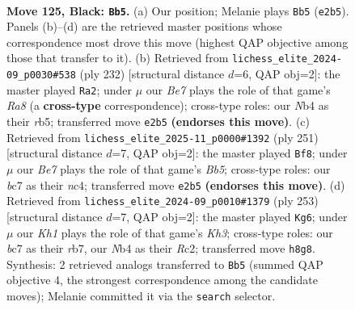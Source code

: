 \documentclass[11pt]{article}
\begin{document}
\clearpage

\begin{figure}[p]\centering
\begin{subfigure}{0.46\textwidth}\centering
\resizebox{\linewidth}{!}{%
\newchessgame
\chessboard[
  setfen={7k/2B5/5PK1/8/1n6/8/4b3/8 b - - 0 125},
  showmover=false,
  pgfstyle=straightmove, color=movearrow, markmove={e2-b5}
]}
\caption{}
\end{subfigure}\hfill
\begin{subfigure}{0.46\textwidth}\centering
\resizebox{\linewidth}{!}{%
\newchessgame
\chessboard[
  setfen={R7/8/8/1r6/4K1k1/7p/7B/8 w - - 24 117},
  showmover=false,
  pgfstyle=straightmove, color=movearrow, markmove={a8-a2}
]}
\caption{}
\end{subfigure}
\\[4pt]
\begin{subfigure}{0.46\textwidth}\centering
\resizebox{\linewidth}{!}{%
\newchessgame
\chessboard[
  setfen={8/5P2/4K3/8/1bN5/8/5k2/8 b - - 82 126},
  showmover=false,
  pgfstyle=straightmove, color=movearrow, markmove={b4-f8}
]}
\caption{}
\end{subfigure}\hfill
\begin{subfigure}{0.46\textwidth}\centering
\resizebox{\linewidth}{!}{%
\newchessgame
\chessboard[
  setfen={8/1R6/4KP1k/8/8/8/2r5/8 b - - 8 127},
  showmover=false,
  pgfstyle=straightmove, color=movearrow, markmove={h6-g6}
]}
\caption{}
\end{subfigure}
\caption{\textbf{Move 125, Black: \texttt{Bb5}.} (a) Our position; Melanie plays \texttt{Bb5} (\texttt{e2b5}). Panels (b)--(d) are the retrieved master positions whose correspondence most drove this move (highest QAP objective among those that transfer to it). (b) Retrieved from \texttt{lichess\_elite\_2024-09\_p0030\#538} (ply 232) [structural distance $d$=6, QAP obj=2]: the master played \texttt{Ra2}; under $\mu$ our \emph{Be7} plays the role of that game's \emph{Ra8} (a \textbf{cross-type} correspondence); cross-type roles: our \emph{N}b4 as their \emph{r}b5; transferred move \texttt{e2b5} \textbf{(endorses this move)}. (c) Retrieved from \texttt{lichess\_elite\_2025-11\_p0000\#1392} (ply 251) [structural distance $d$=7, QAP obj=2]: the master played \texttt{Bf8}; under $\mu$ our \emph{Be7} plays the role of that game's \emph{Bb5}; cross-type roles: our \emph{b}c7 as their \emph{n}c4; transferred move \texttt{e2b5} \textbf{(endorses this move)}. (d) Retrieved from \texttt{lichess\_elite\_2024-09\_p0010\#1379} (ply 253) [structural distance $d$=7, QAP obj=2]: the master played \texttt{Kg6}; under $\mu$ our \emph{Kh1} plays the role of that game's \emph{Kh3}; cross-type roles: our \emph{b}c7 as their \emph{r}b7, our \emph{N}b4 as their \emph{R}c2; transferred move \texttt{h8g8}. Synthesis: 2 retrieved analogs transferred to \texttt{Bb5} (summed QAP objective 4, the strongest correspondence among the candidate moves); Melanie committed it via the \texttt{search} selector.}
\label{fig:thought-m249}
\end{figure}
\end{document}
